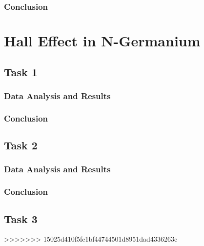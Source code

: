 \documentclass[a4paper]{article}
\begin{document}
\subsubsection{Conclusion}

\section{Hall Effect in N-Germanium}

\subsection{Task 1}

\subsubsection{Data Analysis and Results}

\subsubsection{Conclusion}

\subsection{Task 2}

\subsubsection{Data Analysis and Results}

\subsubsection{Conclusion}

\subsection{Task 3}

>>>>>>> 15025d410f5fc1bf44744501d8951dad4336263c
\end{document}
